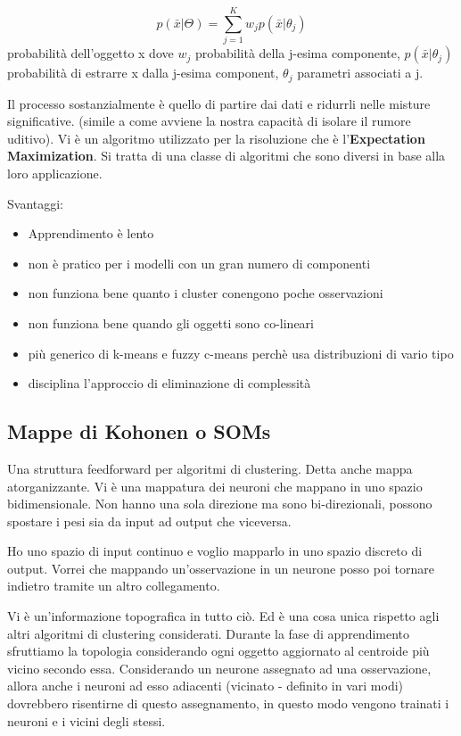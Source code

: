 \[ p(\bar{x}|\Theta) = \sum_{j=1}^{K} w_j p(\bar{x}|\theta_j)\] probabilit\`a dell'oggetto x dove $w_j$ probabilit\`a della j-esima componente, $p(\bar{x}|\theta_j)$ probabilit\`a di estrarre x dalla j-esima component, $\theta_j$ parametri associati a j.

Il processo sostanzialmente \`e quello di partire dai dati e ridurrli nelle misture significative. (simile a come avviene la nostra capacit\`a di isolare il rumore uditivo). Vi \`e un algoritmo utilizzato per la risoluzione che \`e l'\textbf{Expectation Maximization}. Si tratta di una classe di algoritmi che sono diversi in base alla loro applicazione. 

Svantaggi:
\begin{itemize}
	\item Apprendimento \`e lento
	\item non \`e pratico per i modelli con un gran numero di componenti
	\item non funziona bene quanto i cluster conengono  poche osservazioni
	\item non funziona bene quando gli oggetti sono co-lineari
\end{itemize}

\begin{itemize}
	\item pi\`u generico di k-means e fuzzy c-means perch\`e usa distribuzioni di vario tipo
	\item disciplina l'approccio di eliminazione di complessit\`a
\end{itemize}


\subsection{Mappe di Kohonen o SOMs}
Una struttura feedforward per algoritmi di clustering. Detta anche mappa atorganizzante. Vi \`e una mappatura dei neuroni che mappano in uno spazio bidimensionale. Non hanno una sola direzione ma sono bi-direzionali, possono spostare i pesi sia da input ad output che viceversa.

Ho uno spazio di input continuo e voglio mapparlo in uno spazio discreto di output. Vorrei che mappando un'osservazione in un neurone posso poi tornare indietro tramite un altro collegamento.

Vi \`e un'informazione topografica in tutto ci\`o. Ed \`e una cosa unica rispetto agli altri algoritmi di clustering considerati. Durante la fase di apprendimento sfruttiamo la topologia considerando ogni oggetto aggiornato al centroide pi\`u vicino secondo essa. Considerando un neurone assegnato ad una osservazione, allora anche i neuroni ad esso adiacenti (vicinato - definito in vari modi) dovrebbero risentirne di questo assegnamento, in questo modo vengono trainati i neuroni e i vicini degli stessi. 

